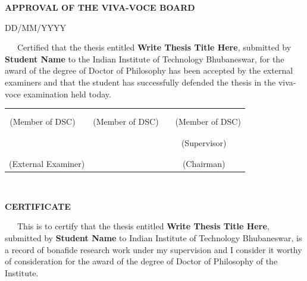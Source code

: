 \thispagestyle{empty}
\begin{center}
	\textbf{\Large APPROVAL OF THE VIVA-VOCE BOARD}
\end{center}
\begin{flushright}
	DD/MM/YYYY
\end{flushright}
~~~Certified that the thesis entitled  \textbf{Write Thesis Title Here}, submitted by \textbf{Student Name} to the Indian Institute of Technology  Bhubaneswar, for the award of the degree of Doctor of Philosophy has been accepted by the external examiners and that the student has successfully defended the thesis in the viva-voce examination held today.
\begin{center}
	\begin{tabular*}{\textwidth}{@{\extracolsep{\fill}}cccccccc}
		&&&&&&&\\
		&&&&&&&\\
		\multicolumn{2}{c}{(Member of DSC)} && \multicolumn{2}{c}{(Member of DSC)} && \multicolumn{2}{c}{(Member of DSC)}\\
		&&&&&&&\\
		&&&&&&&\\
		\multicolumn{3}{c}{} &&& \multicolumn{3}{c}{(Supervisor)}\\
		&&&&&&&\\
		&&&&&&&\\
		\multicolumn{3}{c}{(External Examiner)} &&& \multicolumn{3}{c}{(Chairman)}\\
	\end{tabular*}
\end{center}

\newpage

\thispagestyle{empty}
{~} %
\vspace{10em} %
\begin{center}
	\textbf{\Large CERTIFICATE}
\end{center}
~~~This is to certify that the thesis entitled  \textbf{Write Thesis Title Here}, submitted by \textbf{Student Name} to Indian Institute of Technology  Bhubaneswar, is a record of bonafide research work under my supervision and I consider it worthy of consideration for the award of the degree of Doctor of Philosophy of the Institute.

